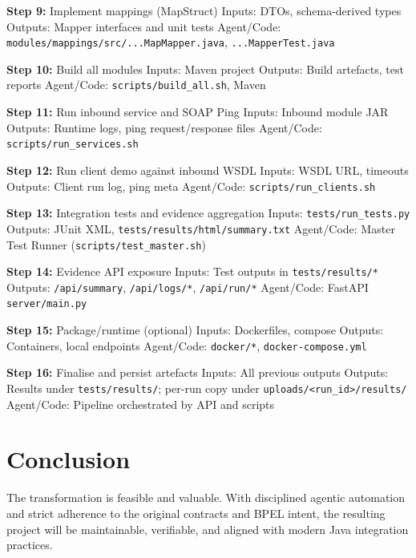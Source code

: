 \documentclass[11pt,a4paper]{article}
\begin{document}
\begin{algorithm}[H]
\caption{End-to-End Project Workflow (Steps 9–16)}\label{alg:pseudocode-workflow-2}
\begin{algorithmic}[1]
\State \textbf{Step 9:} Implement mappings (MapStruct)
\Statex Inputs: DTOs, schema-derived types
\Statex Outputs: Mapper interfaces and unit tests
\Statex Agent/Code: \texttt{modules/mappings/src/...MapMapper.java}, \texttt{...MapperTest.java}

\State \textbf{Step 10:} Build all modules
\Statex Inputs: Maven project
\Statex Outputs: Build artefacts, test reports
\Statex Agent/Code: \texttt{scripts/build\_all.sh}, Maven

\State \textbf{Step 11:} Run inbound service and SOAP Ping
\Statex Inputs: Inbound module JAR
\Statex Outputs: Runtime logs, ping request/response files
\Statex Agent/Code: \texttt{scripts/run\_services.sh}

\State \textbf{Step 12:} Run client demo against inbound WSDL
\Statex Inputs: WSDL URL, timeouts
\Statex Outputs: Client run log, ping meta
\Statex Agent/Code: \texttt{scripts/run\_clients.sh}

\State \textbf{Step 13:} Integration tests and evidence aggregation
\Statex Inputs: \texttt{tests/run\_tests.py}
\Statex Outputs: JUnit XML, \texttt{tests/results/html/summary.txt}
\Statex Agent/Code: Master Test Runner (\texttt{scripts/test\_master.sh})

\State \textbf{Step 14:} Evidence API exposure
\Statex Inputs: Test outputs in \texttt{tests/results/*}
\Statex Outputs: \texttt{/api/summary}, \texttt{/api/logs/*}, \texttt{/api/run/*}
\Statex Agent/Code: FastAPI \texttt{server/main.py}

\State \textbf{Step 15:} Package/runtime (optional)
\Statex Inputs: Dockerfiles, compose
\Statex Outputs: Containers, local endpoints
\Statex Agent/Code: \texttt{docker/*}, \texttt{docker-compose.yml}

\State \textbf{Step 16:} Finalise and persist artefacts
\Statex Inputs: All previous outputs
\Statex Outputs: Results under \texttt{tests/results/}; per-run copy under \texttt{uploads/\textless run\_id\textgreater/results/}
\Statex Agent/Code: Pipeline orchestrated by API and scripts
\end{algorithmic}
\end{algorithm}




\section{Conclusion}
The transformation is feasible and valuable. With disciplined agentic automation and strict adherence to the original contracts and BPEL intent, the resulting project will be maintainable, verifiable, and aligned with modern Java integration practices.
\end{document}
